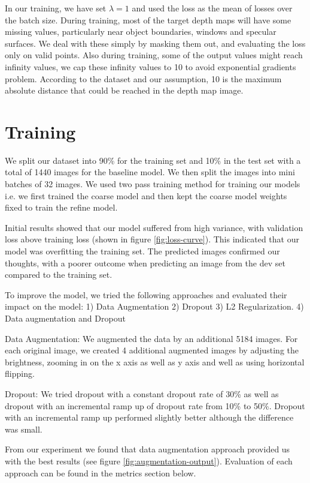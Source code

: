 \documentclass{article}
\begin{document}
    In our training, we have set $\lambda = 1$ and used the loss as the mean of losses over the batch size. During training, most of the target depth maps will have some missing values, particularly near object boundaries, windows and specular surfaces. We deal with these simply by masking them out, and evaluating the loss only on valid points. Also during training, some of the output values might reach infinity values, we cap these infinity values to 10 to avoid exponential gradients problem. According to the dataset and our assumption, 10 is the maximum absolute distance that could be reached in the depth map image.


\section{Training}
    We split our dataset into 90\% for the training set and 10\% in the test set with a total of 1440 images for the baseline model. We then split the images into mini batches of 32 images.
    We used two pass training method for training our models i.e. we first trained the coarse model and then kept the coarse model weights fixed to train the refine model. 
    
    Initial results showed that our model suffered from high variance, with validation loss above training loss (shown in figure \ref{fig:loss-curve}). This indicated that our model was overfitting the training set. The predicted images confirmed our thoughts, with a poorer outcome when predicting an image from the dev set compared to the training set. 

    To improve the model, we tried the following approaches and evaluated their impact on the model: 1) Data Augmentation 2) Dropout 3) L2 Regularization. 4) Data augmentation and Dropout

    Data Augmentation: We augmented the data by an additional 5184 images. For each original image, we created 4 additional augmented images by adjusting the brightness, zooming in on the x axis as well as y axis and well as using horizontal flipping. 
    
    Dropout: We tried dropout with a constant dropout rate of 30\% as well as dropout with an incremental ramp up of dropout rate from 10\% to 50\%. Dropout with an incremental ramp up performed slightly better although the difference was small.
    
    From our experiment we found that data augmentation approach provided us with the best results (see figure \ref{fig:augmentation-output}). Evaluation of each approach can be found in the metrics section below. 
\end{document}
